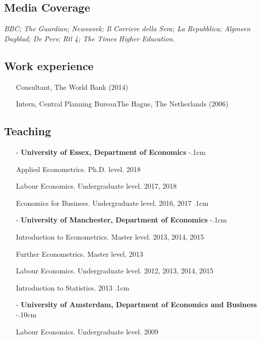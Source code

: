 \documentclass[11pt]{article}
\begin{document}
\subsection*{\sc Media Coverage}
{\emph{BBC; The Guardian; Newsweek; Il Corriere della Sera; La Repubblica; Algmeen Dagblad; De Pers; Rtl 4; The Times Higher Education}.

\subsection*{\sc Work experience}
\begin{itemize}[leftmargin=20pt]
    \itemsep-.1cm
    \item[] Consultant, The World Bank (2014)
    \item[] Intern, Central Planning Bureau\textendash The Hague, The Netherlands (2006)
\end{itemize}

\subsection*{\sc Teaching}
\begin{itemize}[leftmargin=20pt]
    \itemsep0cm
    \item[-]\textbf{University of Essex, Department of Economics}
    \itemsep-.1cm
    \item[] Applied Econometrics. Ph.D. level. 2018
    \item[] Labour Economics. Undergraduate level. 2017, 2018
    \item[] Economics for Business. Undergraduate level. 2016, 2017
    \itemsep.1cm
    \item[-]\textbf{University of Manchester, Department of Economics}
    \itemsep-.1cm
    \item[] Introduction to Econometrics. Master level. 2013, 2014, 2015
    \item[] Further Econometrics. Master level. 2013
    \item[] Labour Economics. Undergraduate level. 2012, 2013, 2014, 2015
    \item[] Introduction to Statistics. 2013
    \itemsep.1cm
    \item[-]\textbf{University of Amsterdam, Department of Economics and Business}
    \itemsep-.10cm
    \item[] Labour Economics. Undergraduate level. 2009

\end{itemize}

}
\end{document}
